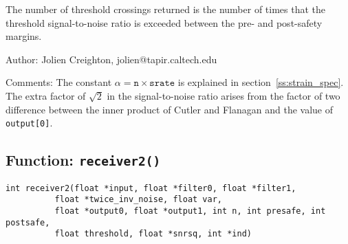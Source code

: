 The number of threshold crossings returned is the number of times that the
threshold signal-to-noise ratio is exceeded between the pre- and post-safety
margins.

\begin{description}
\item{Author:} Jolien Creighton, jolien@tapir.caltech.edu
\item{Comments:} The constant $\alpha=\texttt{n}\times\texttt{srate}$ is
  explained in section~\ref{ss:strain_spec}.  The extra factor of $\surd 2$
  in the signal-to-noise ratio arises from the factor of two difference
  between the inner product of Cutler and Flanagan and the value of
  \texttt{output[0]}.
\end{description}


\clearpage
\subsection{Function: \texttt{receiver2()}}
\label{ss:receiver2}

\begin{verbatim}
int receiver2(float *input, float *filter0, float *filter1,
	      float *twice_inv_noise, float var,
	      float *output0, float *output1, int n, int presafe, int postsafe,
	      float threshold, float *snrsq, int *ind)
\end{verbatim}


